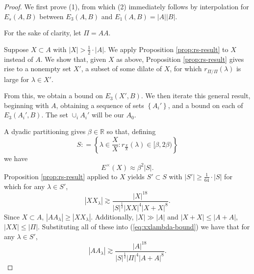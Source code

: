 \documentclass[reqno]{amsart}
\numberwithin{equation}{section}
\begin{document}
\begin{proof}
We first prove (1), from which (2) immediately follows by interpolation for \(E_{s} (A,B)\)
between \(E_3(A,B)\) and \(E_{1} (A,B) = \left\lvert A \right\rvert \left\lvert B \right\rvert \).

For the sake of clarity, let \(\Pi = AA\).

Suppose \(X \subset A\) with \(\left\lvert X \right\rvert  > \frac{1}{2} \cdot \left\lvert A \right\rvert \).
We apply Proposition \ref{prop:rs-result} to \(X\) instead of \(A\).
We show that, given \(X\) as above, Proposition \ref{prop:rs-result} gives rise to a
nonempty set \(X'\), a subset of some dilate of \(X\), for which
\(r_{\Pi / \Pi} (\lambda)\) is large for \(\lambda \in X'\). 

From this, we obtain
a bound on \(E_3(X',B)\). We then iterate this
general result, beginning with \(A\), obtaining a sequence of sets \(\left\{ A_{i} ' \right\} \),
and a bound on each of \(E_3(A_{i} ',B)\). The set \(\cup _{i} A_{i}' \) will be our \(A_0\).

A dyadic partitioning gives \(\beta \in \mathbb{R} \) so that, defining
\[
    S  : = \left\{ \lambda \in \frac{X}{X} : r_{\frac{X}{X} } (\lambda) \in [\beta,2\beta) \right\} 
\]
we have
\[
    E^{\times }(X) \approx \beta ^{2}\left\lvert S  \right\rvert 
.\]
Proposition \ref{prop:rs-result} applied to \(X\) yields \(S ' \subset S \) with \(\left\lvert S ' \right\rvert \geq \frac{1}{64} \cdot \left\lvert S  \right\rvert \) for which
for any \(\lambda \in S'\),
\begin{equation} \label{eq:xxlambda-bound}
    \left\lvert X X_{\lambda}  \right\rvert \gtrsim \frac{\left\lvert X \right\rvert ^{18}}{\left\lvert S \right\rvert ^{\frac{1}{2} } \left\lvert XX \right\rvert ^{4} \left\lvert X + X \right\rvert ^{8}}.
\end{equation}  
Since \(X \subset A\), \(\left\lvert A A_{\lambda}  \right\rvert \geq \left\lvert X X_{\lambda}  \right\rvert \). Additionally, \(\left\lvert X \right\rvert \gg \left\lvert A \right\rvert \)
and \(\left\lvert X + X \right\rvert \leq \left\lvert A+A \right\rvert \), \(\left\lvert XX \right\rvert \leq \left\lvert \Pi \right\rvert \).
Substituting all of these into (\ref{eq:xxlambda-bound}) we have that for any \(\lambda \in S'\),
\[
    \left\lvert A A_{\lambda}  \right\rvert \gtrsim  \frac{\left\lvert A \right\rvert ^{18}}{\left\lvert S \right\rvert ^{\frac{1}{2} } \left\lvert \Pi \right\rvert ^{4} \left\lvert A + A \right\rvert ^{8}} 
.\]


\end{proof}
\end{document}
